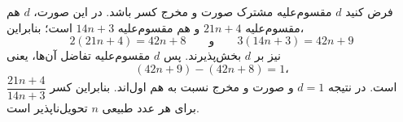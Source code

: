 فرض کنید $d$ مقسوم‌علیه مشترک صورت و مخرج کسر باشد. در این صورت، $d$ هم
مقسوم‌علیه $21n+4$ و هم مقسوم‌علیه $14n+3$ است؛ بنابراین،
\[
    2(21n+4)=42n+8
    \qquad\text{و}\qquad
    3(14n+3)=42n+9
\]
نیز بر $d$ بخش‌پذیرند. پس $d$ مقسوم‌علیه تفاضل آن‌ها، یعنی
\[
    (42n+9)-(42n+8)=1،
\]
است. در نتیجه $d=1$ و صورت و مخرج نسبت به هم اول‌اند. بنابراین کسر
$\dfrac{21n+4}{14n+3}$ برای هر عدد طبیعی $n$ تحویل‌ناپذیر است.
